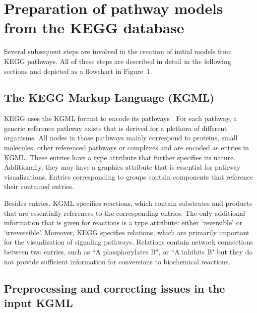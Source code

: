 \documentclass[10pt]{bmc_article}
\newenvironment{bmcformat}{\baselineskip20pt\sloppy\setboolean{publ}{false}}{\baselineskip20pt\sloppy}
\begin{document}
\begin{bmcformat}
\section*{Preparation of pathway models from the KEGG database}

Several subsequent steps are involved in the creation of initial models from KEGG pathways. All of these steps are described in detail in the following sections and depicted as a flowchart in Figure~1.

\subsection*{The KEGG Markup Language (KGML)}
KEGG uses the KGML format to encode its pathways \cite{KGML}. For each pathway, a generic reference pathway exists that is derived for a plethora of different organisms. All nodes in those pathways mainly correspond to proteins, small molecules, other referenced pathways or complexes and are encoded as entries in KGML. These entries have a type attribute that further specifies its nature. Additionally, they may have a graphics attribute that is essential for pathway visualizations. Entries corresponding to groups contain components that reference their contained entries.

Besides entries, KGML specifies reactions, which contain substrates and products that are essentially references to the corresponding entries. The only additional information that is given for reactions is a type attribute: either `reversible' or `irreversible'. Moreover, KEGG specifies relations, which are primarily important for the visualization of signaling pathways. Relations contain network connections between two entries, such as ``A phosphorylates B", or ``A inhibits B" but they do not provide sufficient information for conversions to biochemical reactions.


\subsection*{Preprocessing and correcting issues in the input KGML}



\end{bmcformat}
\end{document}
